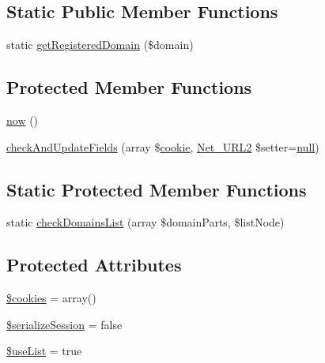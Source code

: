 \subsection*{Static Public Member Functions}
\begin{DoxyCompactItemize}
\item 
static \hyperlink{classHTTP__Request2__CookieJar_a66c53f8393c3562e58491105165e77a9}{get\+Registered\+Domain} (\$domain)
\end{DoxyCompactItemize}
\subsection*{Protected Member Functions}
\begin{DoxyCompactItemize}
\item 
\hyperlink{classHTTP__Request2__CookieJar_af7f3ec95c4a5b2594004b455c82081d6}{now} ()
\item 
\hyperlink{classHTTP__Request2__CookieJar_a518f04b3620e71b98390e2915e6e6d20}{check\+And\+Update\+Fields} (array \$\hyperlink{jquery_8cookie_8js_afabd817194187de2e22c008dcedc6e9a}{cookie}, \hyperlink{classNet__URL2}{Net\+\_\+\+U\+R\+L2} \$setter=\hyperlink{modernizr_8min_8js_a286f9ec831c5e676eeb493248eab9575}{null})
\end{DoxyCompactItemize}
\subsection*{Static Protected Member Functions}
\begin{DoxyCompactItemize}
\item 
static \hyperlink{classHTTP__Request2__CookieJar_a7a04c4cd3170cbf23b42e2cdc1409e7a}{check\+Domains\+List} (array \$domain\+Parts, \$list\+Node)
\end{DoxyCompactItemize}
\subsection*{Protected Attributes}
\begin{DoxyCompactItemize}
\item 
\hyperlink{classHTTP__Request2__CookieJar_ab7bfdc0aa06d9b09b8050cfbdb1afacf}{\$cookies} = array()
\item 
\hyperlink{classHTTP__Request2__CookieJar_ae5e881693fdcfe8cdc23966be0d8a218}{\$serialize\+Session} = false
\item 
\hyperlink{classHTTP__Request2__CookieJar_a931db790fefc72638f7220fc45f16a55}{\$use\+List} = true
\end{DoxyCompactItemize}

